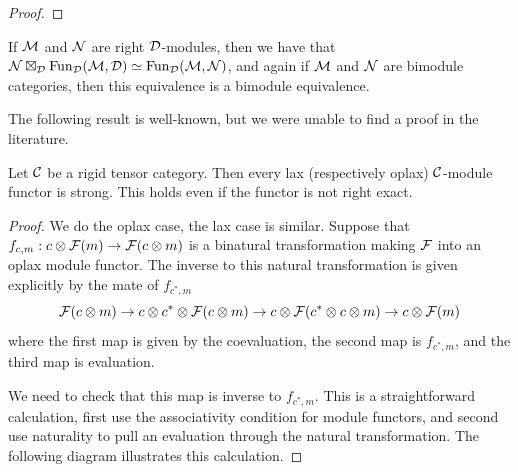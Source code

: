 \documentclass{amsart}
\begin{document}
\begin{proof}
\end{proof}

\begin{remark} \label{remark-tensorasfunctors}
If $\mathcal M$ and $\mathcal N$ are right $\mathcal D$-modules, then we have that $\mathcal N \boxtimes_\mathcal D \operatorname{Fun}_{\mathcal D}(\mathcal M,\mathcal D) \simeq \operatorname{Fun}_{\mathcal D}(\mathcal M,\mathcal N)$, and again if $\mathcal M$ and $\mathcal N$ are bimodule categories, then this equivalence is a bimodule equivalence. 
\end{remark}


The following result is well-known, but we were unable to find a proof in the literature.

\begin{lemma} 
	Let $\mathcal C$ be a rigid tensor category. Then every lax (respectively oplax) $\mathcal C$-module functor is strong. This holds even if the functor is not right exact.   
\end{lemma}

\begin{proof}
We do the oplax case, the lax case is similar.  Suppose that $f_{c,m}:  c \otimes \mathcal F(m) \rightarrow \mathcal F(c \otimes m)$ is a binatural transformation making $\mathcal F$ into an oplax module functor.  The inverse to this natural transformation is given explicitly by the mate of $f_{c^*,m}$ 
$$\mathcal F(c \otimes m) \rightarrow c \otimes c^* \otimes \mathcal F(c \otimes m) \rightarrow c \otimes \mathcal F(c^* \otimes c \otimes m) \rightarrow c \otimes \mathcal F(m)$$
where the first map is given by the coevaluation, the second map is $f_{c^*,m}$, and the third map is evaluation.


We need to check that this map is inverse to $f_{c^*,m}$.  This is a straightforward calculation, first use the associativity condition for module functors, and second use naturality to pull an evaluation through the natural transformation.  The following diagram illustrates this calculation.

\end{proof}
\end{document}
